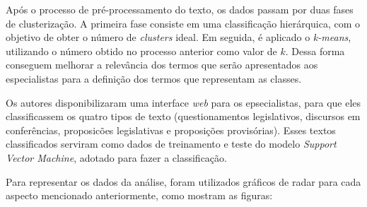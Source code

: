 Após o processo de pré-processamento do texto, os dados passam por duas fases de clusterização. A primeira fase consiste em uma classificação hierárquica, com o objetivo de obter o número de \textit{clusters} ideal. Em seguida, é aplicado o \textit{k-means}, utilizando o número obtido no processo anterior como valor de \(k\). Dessa forma conseguem melhorar a relevância dos termos que serão apresentados aos especialistas para a definição dos termos que representam as classes.

Os autores disponibilizaram uma interface \textit{web} para os epsecialistas, para que eles classificassem os quatro tipos de texto (questionamentos legislativos, discursos em conferências, proposicões legislativas e proposições provisórias). Esses textos classificados serviram como dados de treinamento e teste do modelo \textit{Support Vector Machine}, adotado para fazer a classificação.

Para representar os dados da análise, foram utilizados gráficos de radar para cada aspecto mencionado anteriormente, como mostram as figuras:

